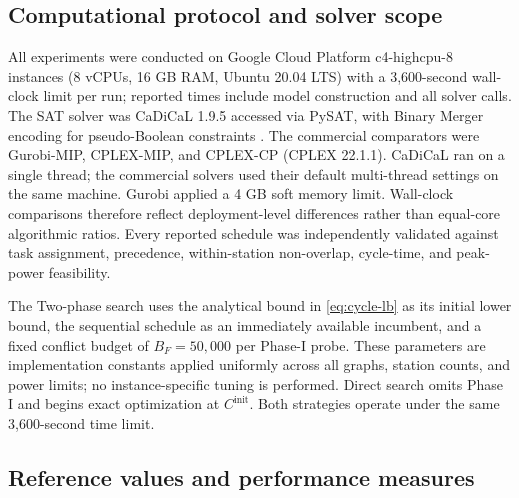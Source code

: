 \documentclass[]{interact}
\theoremstyle{plain}
\theoremstyle{definition}
\theoremstyle{remark}
\newcommand{\Cinit}{C^{\mathrm{init}}}
\begin{document}
\FloatBarrier
\subsection{Computational protocol and solver scope}

All experiments were conducted on Google Cloud Platform c4-highcpu-8 instances (8 vCPUs, 16 GB RAM, Ubuntu 20.04 LTS) with a 3,600-second wall-clock limit per run; reported times include model construction and all solver calls. The SAT solver was CaDiCaL 1.9.5 accessed via PySAT, with Binary Merger encoding for pseudo-Boolean constraints \citep{Ignatiev2018PySAT,Biere2024CaDiCaL}. The commercial comparators were Gurobi-MIP, CPLEX-MIP, and CPLEX-CP (CPLEX 22.1.1). CaDiCaL ran on a single thread; the commercial solvers used their default multi-thread settings on the same machine. Gurobi applied a 4 GB soft memory limit. Wall-clock comparisons therefore reflect deployment-level differences rather than equal-core algorithmic ratios. Every reported schedule was independently validated against task assignment, precedence, within-station non-overlap, cycle-time, and peak-power feasibility.

The Two-phase search uses the analytical bound in \eqref{eq:cycle-lb} as its initial lower bound, the sequential schedule as an immediately available incumbent, and a fixed conflict budget of $B_F=50{,}000$ per Phase-I probe. These parameters are implementation constants applied uniformly across all graphs, station counts, and power limits; no instance-specific tuning is performed. Direct search omits Phase I and begins exact optimization at $\Cinit$. Both strategies operate under the same 3,600-second time limit.

\subsection{Reference values and performance measures}
\end{document}
